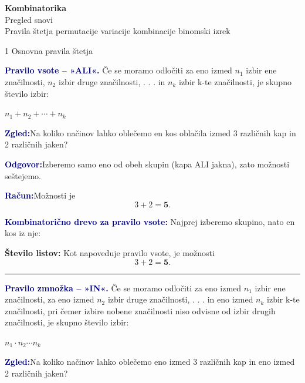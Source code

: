 \documentclass[10pt,a4paper]{article}
\newcommand{\formula}[1]{%
    \par\smallskip\noindent
    \colorbox{pale}{\parbox{\dimexpr\linewidth-2\fboxsep\relax}{\centering\(\displaystyle #1\)}}%
    \par\smallskip}
\newcommand{\zgled}{\par\smallskip\noindent\textcolor{navy}{\textbf{Zgled:}}\quad}
\newcommand{\odgovor}{\textcolor{navy}{\textbf{Odgovor:}}\quad}
\newcommand{\racun}{\par\smallskip\noindent\textcolor{navy}{\textbf{Račun:}}\quad}
\begin{document}
\begin{center}
    {\LARGE\color{navy}\textbf{Kombinatorika}}\\[4pt]
    {\large Pregled snovi}\\[5pt]
    {\small Pravila štetja \enspace\textbullet\enspace permutacije
    \enspace\textbullet\enspace variacije
    \enspace\textbullet\enspace kombinacije
    \enspace\textbullet\enspace binomski izrek}
\end{center}
\vspace{3pt}

\begin{topicbox}{1 \enspace Osnovna pravila štetja}

\textbf{\textcolor{navy}{Pravilo vsote -- »ALI«.}}
Če se moramo odločiti za eno izmed $n_1$ izbir ene značilnosti, $n_2$ izbir druge
značilnosti, . . . in $n_k$ izbir k-te značilnosti, je skupno število izbir:
\formula{n_1+n_2+\cdots+n_k}
\zgled Na koliko načinov lahko oblečemo en kos oblačila izmed 3 različnih kap in 2 različnih
jaken?

\odgovor Izberemo samo eno od obeh skupin (kapa ALI jakna), zato možnosti seštejemo.
\racun Možnosti je
\[
    3+2=\mathbf{5}.
\]


\par\smallskip
\textbf{\textcolor{navy}{Kombinatorično drevo za pravilo vsote:}}
Najprej izberemo skupino, nato en kos iz nje:
\begin{center}
\end{center}
\textbf{Število listov:} Kot napoveduje pravilo vsote, je možnosti
\[
    3+2=\mathbf{5}.
\]


\par\smallskip
\noindent\textcolor{borderblue}{\rule{\linewidth}{0.6pt}}
\smallskip

\textbf{\textcolor{navy}{Pravilo zmnožka -- »IN«.}}
Če se moramo odločiti za eno izmed $n_1$ izbir ene značilnosti, za eno izmed $n_2$ izbir druge značilnosti, . . . in eno izmed $n_k$ izbir k-te
značilnosti, pri čemer izbire nobene značilnosti niso odvisne od izbir drugih značilnosti, je skupno
število izbir:
\formula{n_1\cdot n_2\cdots n_k}
\zgled Na koliko načinov lahko oblečemo eno izmed 3 različnih kap in eno izmed 2 različnih
jaken?


\end{topicbox}
\end{document}
